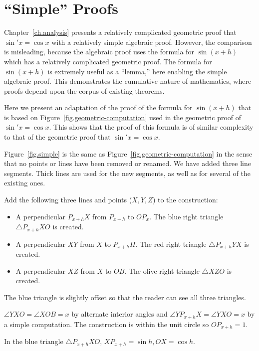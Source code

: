 
\chapter{``Simple'' Proofs}\label{a.simple}

Chapter~\ref{ch.analysis} presents a relatively complicated geometric proof that $\sin' x=\cos x$ with a relatively simple algebraic proof. However, the comparison is misleading, because the algebraic proof uses the formula for $\sin(x+h)$ which has a relatively complicated geometric proof. The formula for $\sin(x+h)$ is extremely useful as a ``lemma,'' here enabling the simple algebraic proof. This demonstrates the cumulative nature of mathematics, where proofs depend upon the corpus of existing theorems.

Here we present an adaptation of the proof of the formula for $\sin(x+h)$ that is based on Figure~\ref{fig.geometric-computation} used in the geometric proof of $\sin' x=\cos x$. This shows that the proof of this formula is of similar complexity to that of the geometric proof that $\sin' x=\cos x$.

Figure~\ref{fig.simple} is the same as Figure~\ref{fig.geometric-computation} in the sense that no points or lines have been removed or renamed. We have added three line segments. Thick lines are used for the new segments, as well as for several of the existing ones.

Add the following three lines and points ($X,Y,Z$) to the construction:
\begin{itemize}
\item A perpendicular $P_{x+h}X$ from $P_{x+h}$ to $OP_x$. The blue right triangle $\triangle P_{x+h}XO$ is created.
\item A perpendicular $XY$ from $X$ to $P_{x+h}H$. The red right triangle $\triangle P_{x+h}YX$ is created.
\item A perpendicular $XZ$ from $X$ to $OB$. The olive right triangle $\triangle XZO$ is created.
\end{itemize}
The blue triangle is slightly offset so that the reader can see all three triangles.

$\angle YXO=\angle XOB=x$ by alternate interior angles and $\angle YP_{x+h}X=\angle YXO=x$ by a simple computation. The construction is within the unit circle so $OP_{x+h}=1$.

In the blue triangle $\triangle P_{x+h}XO$, $XP_{x+h}=\sin h, OX=\cos h$.

